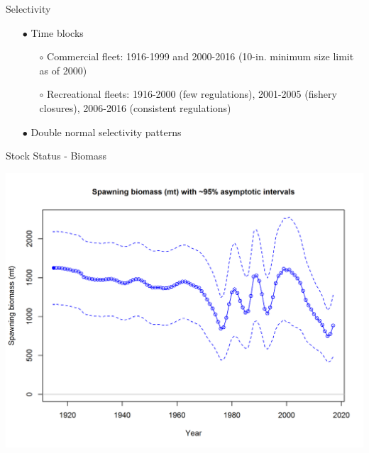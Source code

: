 \documentclass[ignorenonframetext,]{beamer}
\begin{document}
\begin{frame}{Selectivity}

\begin{itemize}
\item[$\bullet$] Time blocks
\begin{itemize}
\item[$\circ$] Commercial fleet: 1916-1999 and 2000-2016 (10-in. minimum size limit as of 2000)
\item[$\circ$] Recreational fleets: 1916-2000 (few regulations), 2001-2005 (fishery closures), 2006-2016 (consistent regulations)
\end{itemize}
\item[$\bullet$] Double normal selectivity patterns
\end{itemize}

\end{frame}

\begin{frame}{Stock Status - Biomass}

\centering
\includegraphics{r4ss/plots_mod1/ts7_Spawning_biomass_(mt)_with_95_asymptotic_intervals_intervals.png}

\end{frame}
\end{document}
